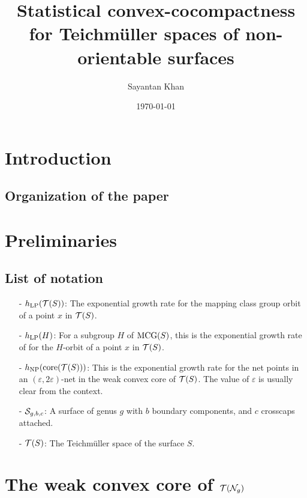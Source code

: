 \documentclass[12pt, reqno]{amsart}
\title[Statistical convex-cocompactness for $\teich(\no_g)$]{Statistical convex-cocompactness for Teichmüller spaces of non-orientable surfaces}
\author{Sayantan Khan}
\date{\today}
\begin{document}
\begin{abstract}

\end{abstract}
\maketitle
\tableofcontents

\section{Introduction}
\label{sec:introduction}

\subsection*{Organization of the paper}

\section{Preliminaries}
\label{sec:preliminaries}

\subsection*{List of notation}
\begin{itemize}
\item[-] $h_{\mathrm{LP}}(\mathcal{T}(S))$: The exponential growth rate for the mapping class group orbit of a point $x$ in $\mathcal{T}(S)$.
\item[-] $h_{\mathrm{LP}}(H)$: For a subgroup $H$ of $\mathrm{MCG}(S)$, this is the exponential growth rate of for the $H$-orbit of a point $x$ in $\mathcal{T}(S)$.
\item[-] $h_{\mathrm{NP}}(\mathrm{core}(\mathcal{T}(S)))$: This is the exponential growth rate for the net points in an $(\varepsilon, 2 \varepsilon)$-net in the weak convex core of $\mathcal{T}(S)$. The value of $\varepsilon$ is usually clear from the context.
\item[-] $\mathcal{S}_{g,b,c}$: A surface of genus $g$ with $b$ boundary components, and $c$ crosscaps attached.
\item[-] $\mathcal{T}(S)$: The Teichmüller space of the surface $S$.
\end{itemize}

\section{The weak convex core of $\teich(\no_g)$}
\label{sec:weak-convex-core}
\end{document}
